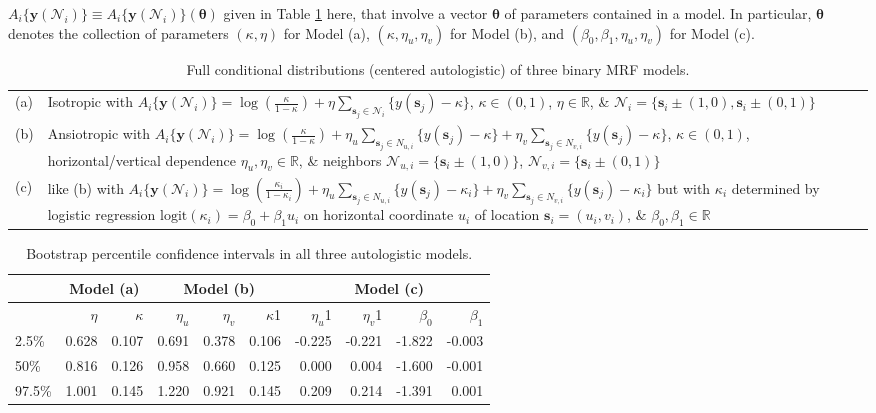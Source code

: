 \documentclass[12pt]{article}
\theoremstyle{definition}
\begin{document}
\(A_i\{\boldsymbol y(\mathcal{N}_i)\} \equiv A_i\{\boldsymbol y(\mathcal{N}_i)\}(\boldsymbol \theta)\) given in Table \ref{tab:natural-params} here, that involve a vector \(\boldsymbol \theta\) of parameters contained in a model. In particular, \(\boldsymbol \theta\) denotes the collection of parameters \((\kappa, \eta)\) for Model (a), \((\kappa, \eta_u, \eta_v)\) for Model (b), and \((\beta_0,\beta_1, \eta_u, \eta_v)\) for Model (c).
\begin{table}[t]
\caption{Full conditional distributions (centered autologistic) of three binary MRF models.}
\label{tab:natural-params}
\centering
\begin{tabular}{|p{.1in}  p{6.0in} |}
\hline
(a)& Isotropic with $A_i\{\boldsymbol y(\mathcal{N}_i)\} = \log\left(\frac{\kappa}{1-\kappa}\right) + \eta\sum\limits_{\boldsymbol s_j \in \mathcal{N}_i}\{y(\boldsymbol s_j) - \kappa\}$, $\kappa\in(0,1)$, $\eta\in\mathbb{R}$, \& $\mathcal{N}_i =\{\boldsymbol s_i\pm (1,0),\boldsymbol s_i\pm (0,1)\}$     \\[.3cm]
(b) &Ansiotropic with $A_i\{\boldsymbol y(\mathcal{N}_i)\} = \log\left(\frac{\kappa}{1-\kappa}\right) + \eta_u\sum\limits_{\boldsymbol s_j \in N_{u,i}}\{y(\boldsymbol s_j) - \kappa\} + \eta_v\sum\limits_{\boldsymbol s_j \in N_{v,i}}\{y(\boldsymbol s_j) - \kappa\}$, $\kappa \in (0,1)$, horizontal/vertical dependence $\eta_u,\eta_v\in\mathbb{R}$, \& neighbors $\mathcal{N}_{u,i}=\{\boldsymbol s_i \pm (1,0)\}$, $\mathcal{N}_{v,i}=\{\boldsymbol s_i \pm (0,1)\}$   \\[.3cm]
(c) & like (b) with $A_i\{\boldsymbol y(\mathcal{N}_i)\}  = \log\left(\frac{\kappa_i}{1-\kappa_i}\right) + \eta_u\sum\limits_{\boldsymbol s_j \in N_{u,i}}\{y(\boldsymbol s_j) - \kappa_i\} + \eta_v\sum\limits_{\boldsymbol s_j \in N_{v,i}}\{y(\boldsymbol s_j) - \kappa_i\}$
but with $\kappa_i$ determined by  logistic regression $\mathrm{logit}(\kappa_i)  = \beta_0 + \beta_1 u_i$
on  horizontal coordinate $u_i$ of location $\boldsymbol s_i=(u_i,v_i)$,  \& $\beta_0,\beta_1\in\mathbb{R}$    \\
\hline
\end{tabular}
\end{table}
\begin{table}[ht]
\centering
\begin{tabular}{|l|rr|rrr|rrrr|}
  \hline &\multicolumn{2}{|c|}{Model (a)} & \multicolumn{3}{|c|}{Model (b)} & \multicolumn{4}{|c|}{Model (c)} \\
 \hline
 & $\eta$ & $\kappa$ & $\eta_u$ & $\eta_v$ & $\kappa$1 & $\eta_u$1 & $\eta_v$1 & $\beta_0$ & $\beta_1$ \\ 
  \hline
2.5\% & 0.628 & 0.107 & 0.691 & 0.378 & 0.106 & -0.225 & -0.221 & -1.822 & -0.003 \\ 
  50\% & 0.816 & 0.126 & 0.958 & 0.660 & 0.125 & 0.000 & 0.004 & -1.600 & -0.001 \\ 
  97.5\% & 1.001 & 0.145 & 1.220 & 0.921 & 0.145 & 0.209 & 0.214 & -1.391 & 0.001 \\ 
   \hline
\end{tabular}
\caption{Bootstrap percentile confidence intervals in all three autologistic models.} 
\label{tab:endive-table}
\end{table}
\end{document}
